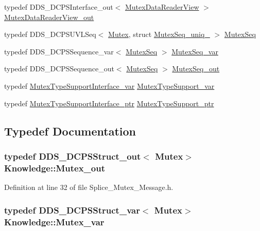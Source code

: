 \begin{DoxyCompactItemize}
\item 
typedef DDS\_\-DCPSInterface\_\-out$<$ \hyperlink{classKnowledge_1_1MutexDataReaderView}{MutexDataReaderView} $>$ \hyperlink{namespaceKnowledge_a4390ee0ebae0085c32130a6f894d1cee}{MutexDataReaderView\_\-out}
\item 
typedef DDS\_\-DCPSUVLSeq$<$ \hyperlink{structKnowledge_1_1Mutex}{Mutex}, struct \hyperlink{structKnowledge_1_1MutexSeq__uniq__}{MutexSeq\_\-uniq\_\-} $>$ \hyperlink{namespaceKnowledge_a3165529aa87299c6a92754fbd7eeeff4}{MutexSeq}
\item 
typedef DDS\_\-DCPSSequence\_\-var$<$ \hyperlink{namespaceKnowledge_a3165529aa87299c6a92754fbd7eeeff4}{MutexSeq} $>$ \hyperlink{namespaceKnowledge_a8d0cc4b24b6fed706c73d5a321910fa8}{MutexSeq\_\-var}
\item 
typedef DDS\_\-DCPSSequence\_\-out$<$ \hyperlink{namespaceKnowledge_a3165529aa87299c6a92754fbd7eeeff4}{MutexSeq} $>$ \hyperlink{namespaceKnowledge_a2cb18227e83b174622e0f73179f97620}{MutexSeq\_\-out}
\item 
typedef \hyperlink{namespaceKnowledge_acaf157b3817dc52861f4ff75fcd3c2d4}{MutexTypeSupportInterface\_\-var} \hyperlink{namespaceKnowledge_ab12ce85b6674cdb389f8ab17f3e59dd1}{MutexTypeSupport\_\-var}
\item 
typedef \hyperlink{classKnowledge_1_1MutexTypeSupportInterface}{MutexTypeSupportInterface\_\-ptr} \hyperlink{namespaceKnowledge_af5719967cc28ec0bc5a03cc0ee80fb55}{MutexTypeSupport\_\-ptr}
\end{DoxyCompactItemize}


\subsection{Typedef Documentation}
\hypertarget{namespaceKnowledge_a606af024913884d85f7eaf14a8d40a12}{
\subsubsection[{Mutex\_\-out}]{\setlength{\rightskip}{0pt plus 5cm}typedef DDS\_\-DCPSStruct\_\-out$<$ {\bf Mutex}$>$ {\bf Knowledge::Mutex\_\-out}}}
\label{da/d50/namespaceKnowledge_a606af024913884d85f7eaf14a8d40a12}


Definition at line 32 of file Splice\_\-Mutex\_\-Message.h.

\hypertarget{namespaceKnowledge_a72facb8019d712476fda564e4250fd7d}{
\subsubsection[{Mutex\_\-var}]{\setlength{\rightskip}{0pt plus 5cm}typedef DDS\_\-DCPSStruct\_\-var$<$ {\bf Mutex}$>$ {\bf Knowledge::Mutex\_\-var}}}
\label{da/d50/namespaceKnowledge_a72facb8019d712476fda564e4250fd7d}


